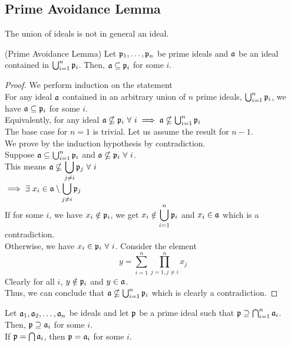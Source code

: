 \subsection{Prime Avoidance Lemma}
The union of ideals is not in general an ideal.
\begin{lemma}{(Prime Avoidance Lemma)}{}
	Let \( \mathfrak{p}_1, \ldots, \mathfrak{p}_n \) be prime ideals and
	\( \mathfrak{a} \) be an ideal contained in \( \bigcup_{i=1}^n \mathfrak{p}_i \).
	Then, \( \mathfrak{a} \subseteq \mathfrak{p}_i \) for some \( i \).
\end{lemma}
\begin{proof}
	We perform induction on the statement \\
	For any ideal \( \mathfrak{a} \) contained in an arbitrary union
	of \( n \) prime ideals, \( \bigcup_{i=1}^n \mathfrak{p}_i \),
	we have \( \mathfrak{a} \subseteq \mathfrak{p}_i \) for some \( i \). \\
	Equivalently, for any ideal \( \mathfrak{a} \nsubseteq \mathfrak{p}_i \ \forall\ i
	\implies \mathfrak{a} \nsubseteq \bigcup_{i=1}^n \mathfrak{p}_i \) \\


	The base case for \( n = 1 \) is trivial.
	Let us assume the result for \( n-1 \). \\
	We prove by the induction hypothesis by contradiction. \\
	Suppose \( \mathfrak{a} \subseteq \bigcup_{i=1}^{n} \mathfrak{p}_i \) and
	\( \mfa \nsubseteq \mfp_i \ \forall\ i \). \\

	This means \( \displaystyle \mathfrak{a} \nsubseteq \bigcup_{j \neq i}
		\mathfrak{p}_j \ \forall\ i \) \\
	\( \displaystyle \implies \exists\ x_i \in
		\mathfrak{a} \setminus \bigcup_{j \neq i} \mathfrak{p}_j \) \\
	If for some \( i \), we have \( x_i \notin \mathfrak{p}_i \), we get
	\( \displaystyle x_i \notin \bigcup_{i=1}^n \mathfrak{p}_i \) and
	\( x_i \in \mathfrak{a} \) which is a contradiction. \\

	Otherwise, we have \( x_i \in \mfp_i \ \forall\ i \).
	Consider the element
	\[
		y = \sum_{i=1}^n \prod_{j=1, j \neq i}^n x_j
	\]
	Clearly for all \( i \), \( y \notin \mathfrak{p}_i \) and \( y \in \mathfrak{a} \). \\
	Thus, we can conclude that \( \mathfrak{a} \nsubseteq \bigcup_{i=1}^n \mathfrak{p}_i \)
	which is clearly a contradiction.
\end{proof}

\begin{corollary}{}{}
	Let \( \mathfrak{a}_1, \mathfrak{a}_2, \ldots, \mathfrak{a}_n \) be ideals and let \( \mathfrak{p} \)
	be a prime ideal such that \( \mathfrak{p} \supseteq \bigcap_{i=1}^n \mathfrak{a}_i \). \\
	Then, \( \mathfrak{p} \supseteq \mathfrak{a}_i \) for some \( i \). \\
	If \( \mathfrak{p} = \bigcap \mathfrak{a}_i \), then \( \mathfrak{p} = \mathfrak{a}_i \) for some \( i \).
\end{corollary}

